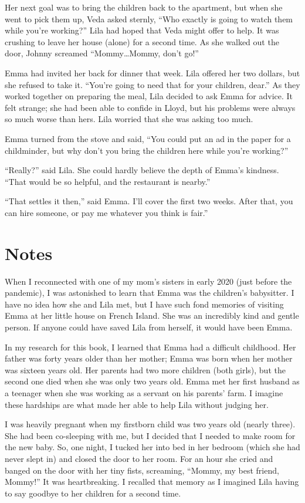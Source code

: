 \documentclass[
  american,
  letterpaper,
]{book}
\begin{document}
Her next goal was to bring the children back to the apartment, but when
she went to pick them up, Veda asked sternly, ``Who exactly is going to
watch them while you're working?'' Lila had hoped that Veda might offer
to help. It was crushing to leave her house (alone) for a second time.
As she walked out the door, Johnny screamed ``Mommy\ldots Mommy, don't
go!''

Emma had invited her back for dinner that week. Lila offered her two
dollars, but she refused to take it. ``You're going to need that for
your children, dear.'' As they worked together on preparing the meal,
Lila decided to ask Emma for advice. It felt strange; she had been able
to confide in Lloyd, but his problems were always so much worse than
hers. Lila worried that she was asking too much.

Emma turned from the stove and said, ``You could put an ad in the paper
for a childminder, but why don't you bring the children here while
you're working?''

``Really?'' said Lila. She could hardly believe the depth of Emma's
kindness. ``That would be so helpful, and the restaurant is nearby.''

``That settles it then,'' said Emma. I'll cover the first two weeks.
After that, you can hire someone, or pay me whatever you think is
fair.''

\section{Notes}\label{notes-46}

When I reconnected with one of my mom's sisters in early 2020 (just
before the pandemic), I was astonished to learn that Emma was the
children's babysitter. I have no idea how she and Lila met, but I have
such fond memories of visiting Emma at her little house on French
Island. She was an incredibly kind and gentle person. If anyone could
have saved Lila from herself, it would have been Emma.

In my research for this book, I learned that Emma had a difficult
childhood. Her father was forty years older than her mother; Emma was
born when her mother was sixteen years old. Her parents had two more
children (both girls), but the second one died when she was only two
years old. Emma met her first husband as a teenager when she was working
as a servant on his parents' farm. I imagine these hardships are what
made her able to help Lila without judging her.

I was heavily pregnant when my firstborn child was two years old (nearly
three). She had been co-sleeping with me, but I decided that I needed to
make room for the new baby. So, one night, I tucked her into bed in her
bedroom (which she had never slept in) and closed the door to her room.
For an hour she cried and banged on the door with her tiny fists,
screaming, ``Mommy, my best friend, Mommy!'' It was heartbreaking. I
recalled that memory as I imagined Lila having to say goodbye to her
children for a second time.
\end{document}
